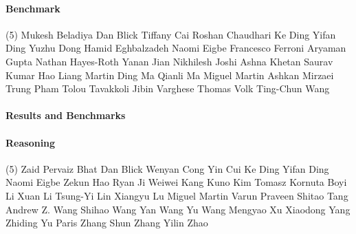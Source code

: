 \vspace{-0.32\baselineskip}\paragraph{\footnotesize Benchmark} \mbox{}
\vspace{-0.32\baselineskip}
\begingroup
\footnotesize
\begin{tasks}[label=\relax, label-width=0pt, item-indent=4pt](5)
\task Mukesh Beladiya
\task Dan Blick
\task Tiffany Cai
\task Roshan Chaudhari
\task Ke Ding
\task Yifan Ding
\task Yuzhu Dong
\task Hamid Eghbalzadeh
\task Naomi Eigbe
\task Francesco Ferroni
\task Aryaman Gupta
\task Nathan Hayes-Roth
\task Yanan Jian
\task Nikhilesh Joshi
\task Ashna Khetan
\task Saurav Kumar
\task Hao Liang
\task Martin Ding Ma
\task Qianli Ma
\task Miguel Martin
\task Ashkan Mirzaei
\task Trung Pham
\task Tolou Tavakkoli
\task Jibin Varghese
\task Thomas Volk
\task Ting-Chun Wang
\end{tasks}
\endgroup

\paragraph{Results and Benchmarks} \mbox{}
\vspace{-0.32\baselineskip}\paragraph{\footnotesize Reasoning} \mbox{}
\vspace{-0.32\baselineskip}
\begingroup
\footnotesize
\begin{tasks}[label=\relax, label-width=0pt, item-indent=4pt](5)
\task Zaid Pervaiz Bhat
\task Dan Blick
\task Wenyan Cong
\task Yin Cui
\task Ke Ding
\task Yifan Ding
\task Naomi Eigbe
\task Zekun Hao
\task Ryan Ji
\task Weiwei Kang
\task Kuno Kim
\task Tomasz Kornuta
\task Boyi Li
\task Xuan Li
\task Tsung-Yi Lin
\task Xiangyu Lu
\task Miguel Martin
\task Varun Praveen
\task Shitao Tang
\task Andrew Z. Wang
\task Shihao Wang
\task Yan Wang
\task Yu Wang
\task Mengyao Xu
\task Xiaodong Yang
\task Zhiding Yu
\task Paris Zhang
\task Shun Zhang
\task Yilin Zhao
\end{tasks}
\endgroup

